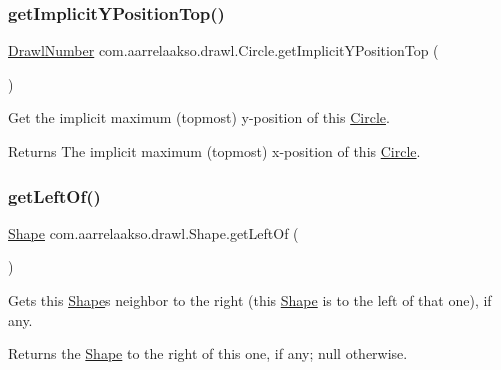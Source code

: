 \subsubsection{\texorpdfstring{get\+Implicit\+Y\+Position\+Top()}{getImplicitYPositionTop()}}
{\footnotesize\ttfamily \hyperlink{classcom_1_1aarrelaakso_1_1drawl_1_1_drawl_number}{Drawl\+Number} com.\+aarrelaakso.\+drawl.\+Circle.\+get\+Implicit\+Y\+Position\+Top (\begin{DoxyParamCaption}{ }\end{DoxyParamCaption})\hspace{0.3cm}{\ttfamily [protected]}}



Get the implicit maximum (topmost) y-\/position of this \hyperlink{classcom_1_1aarrelaakso_1_1drawl_1_1_circle}{Circle}. 

\begin{DoxyReturn}{Returns}
The implicit maximum (topmost) x-\/position of this \hyperlink{classcom_1_1aarrelaakso_1_1drawl_1_1_circle}{Circle}. 
\end{DoxyReturn}
\mbox{\label{classcom_1_1aarrelaakso_1_1drawl_1_1_shape_a2b19d5964ac46d545a7bae3133df6532}} 
\subsubsection{\texorpdfstring{get\+Left\+Of()}{getLeftOf()}}
{\footnotesize\ttfamily \hyperlink{classcom_1_1aarrelaakso_1_1drawl_1_1_shape}{Shape} com.\+aarrelaakso.\+drawl.\+Shape.\+get\+Left\+Of (\begin{DoxyParamCaption}{ }\end{DoxyParamCaption})\hspace{0.3cm}{\ttfamily [inherited]}}



Gets this \hyperlink{classcom_1_1aarrelaakso_1_1drawl_1_1_shape}{Shape}\textquotesingle{}s neighbor to the right (this \hyperlink{classcom_1_1aarrelaakso_1_1drawl_1_1_shape}{Shape} is to the left of that one), if any. 

\begin{DoxyReturn}{Returns}
the \hyperlink{classcom_1_1aarrelaakso_1_1drawl_1_1_shape}{Shape} to the right of this one, if any; {\ttfamily null} otherwise. 
\end{DoxyReturn}
\mbox{\label{classcom_1_1aarrelaakso_1_1drawl_1_1_shape_aeffa96786ca552adf46924ec77da9555}} 
